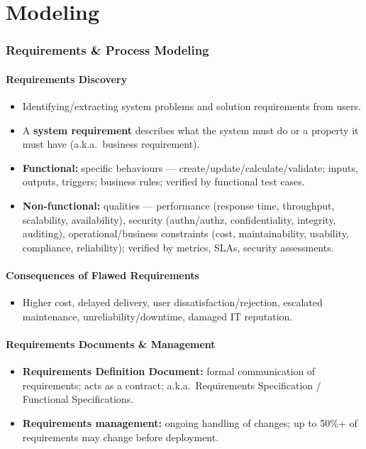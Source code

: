 \documentclass[hidelinks]{article}
\begin{document}
\part{Modeling}

\section{Requirements \& Process Modeling}

\subsection{Requirements Discovery}
\begin{itemize}
  \item Identifying/extracting system problems and solution requirements from users.
  \item A \textbf{system requirement} describes what the system must do or a property it must have
        (a.k.a.\ business requirement).
  \item \textbf{Functional:} specific behaviours --- create/update/calculate/validate; inputs,
        outputs, triggers; business rules; verified by functional test cases.
  \item \textbf{Non-functional:} qualities --- performance (response time, throughput,
        scalability, availability), security (authn/authz, confidentiality, integrity, auditing),
        operational/business constraints (cost, maintainability, usability, compliance, reliability);
        verified by metrics, SLAs, security assessments.
\end{itemize}

\subsection{Consequences of Flawed Requirements}
\begin{itemize}
  \item Higher cost, delayed delivery, user dissatisfaction/rejection, escalated maintenance,
        unreliability/downtime, damaged IT reputation.
\end{itemize}

\subsection{Requirements Documents \& Management}
\begin{itemize}
  \item \textbf{Requirements Definition Document:} formal communication of requirements; acts as a
        contract; a.k.a.\ Requirements Specification / Functional Specifications.
  \item \textbf{Requirements management:} ongoing handling of changes; up to 50\%+ of requirements
        may change before deployment.
\end{itemize}
\end{document}
